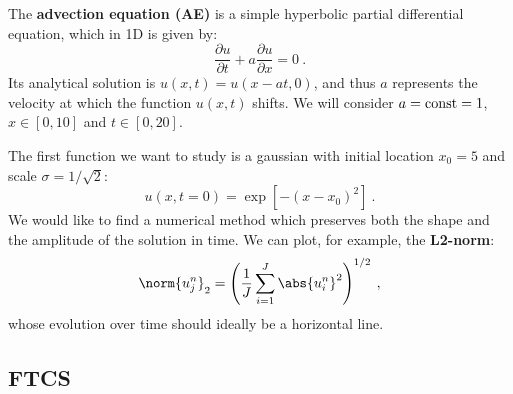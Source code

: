 The \textbf{advection equation (AE)} is a simple hyperbolic partial differential equation, which in 1D is given by:
\begin{equation}
    \frac{\partial{u}}{\partial{t}} + a \frac{\partial{u}}{\partial{x}} = 0 \:.
    \label{eq:advection}
\end{equation}
Its analytical solution is $u(x, t) = u(x-at, 0)$, and thus $a$ represents the velocity at which the function $u(x, t)$ shifts. We will consider $a={\rm const}=1$, $x \in \left[0,10\right]$ and $t \in \left[0,20\right]$.

\vspace{4mm}  

The first function we want to study is a gaussian with initial location $x_0=5$ and scale $\sigma=1/\sqrt{2}$:
\begin{equation}
    u(x, t=0) = \exp{\left[-(x-x_0)^2\right]} \:.
    \label{eq:gaussian}
\end{equation}
We would like to find a numerical method which preserves both the shape and the amplitude of the solution in time. We can plot, for example, the \textbf{L2-norm}:
\begin{equation} 
    \norm{u_j^n}_2 = \left(\frac{1}{J} \sum_{i = 1}^J \abs{u_i^n}^2\right)^{1/2} \:,
    \label{eq:l2norm}
\end{equation}
whose evolution over time should ideally be a horizontal line.




\subsection{FTCS} \label{advection_FTCS}



